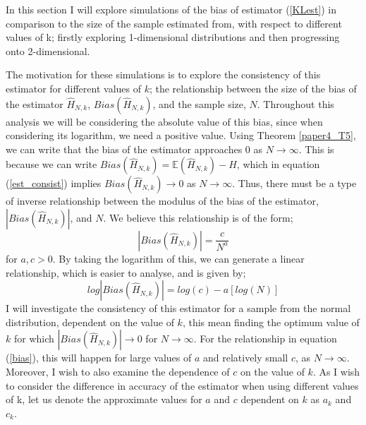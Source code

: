 \documentclass{article}
\begin{document}
In this section I will explore simulations of the bias of estimator (\ref{KLest}) in comparison to the size of the sample estimated from, with respect to different values of k; firstly exploring 1-dimensional distributions and then progressing onto 2-dimensional.

The motivation for these simulations is to explore the consistency of this estimator for different values of $k$; the relationship between the size of the bias of the estimator $\hat{H}_{N, k}$, $Bias(\hat{H}_{N, k})$,  and the sample size, $N$. Throughout this analysis we will be considering the absolute value of this bias, since when considering its logarithm, we need a positive value. Using Theorem \ref{paper4_T5}, we can write that the bias of the estimator approaches 0 as $N \to \infty$. This is because we can write $Bias(\hat{H}_{N, k} ) = \mathbb{E}(\hat{H}_{N, k}) - H$, which in equation (\ref{est_consist}) implies $Bias(\hat{H}_{N, k}) \to 0$ as $N \to \infty$. Thus, there must be a type of inverse relationship between the modulus of the bias of the estimator, $|Bias(\hat{H}_{N, k})|$, and $N$. We believe this relationship is of the form;
\begin{equation} \label{bias}
|Bias(\hat{H}_{N, k})| = \frac{c}{N^a}
\end{equation}
for $a, c > 0$. By taking the logarithm of this, we can generate a linear relationship, which is easier to analyse, and is given by;
\begin{equation} \label{logbias}
log|Bias(\hat{H}_{N, k})| = log(c) - a [log(N)]
\end{equation}
I will investigate the consistency of this estimator for a sample from the normal distribution, dependent on the value of $k$, this mean finding the optimum value of $k$ for which $|Bias(\hat{H}_{N, k})| \to 0$ for $N \to \infty$. For the relationship in equation (\ref{bias}), this will happen for large values of $a$ and relatively small $c$, as $N \to \infty$. Moreover, I wish to also examine the dependence of $c$ on the value of $k$. As I wish to consider the difference in accuracy of the estimator when using different values of k, let us denote the approximate values for $a$ and $c$ dependent on $k$ as $a_{k}$ and $c_{k}$.
\end{document}
